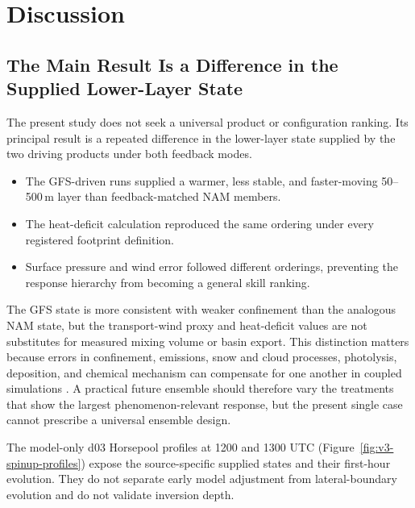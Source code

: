 \documentclass[air,article,submit,moreauthors]{Definitions/mdpi}
\begin{document}
\section{Discussion}
\label{sec:v3-discussion}

\subsection{The Main Result Is a Difference in the Supplied Lower-Layer State}
\label{sec:v3-disc-supplied-state}

The present study does not seek a universal product or configuration ranking.
Its principal result is a repeated difference in the lower-layer state supplied by the two driving products under both feedback modes.

\begin{itemize}
  \item The GFS-driven runs supplied a warmer, less stable, and faster-moving 50--500\,m layer than feedback-matched NAM members.
  \item The heat-deficit calculation reproduced the same ordering under every registered footprint definition.
  \item Surface pressure and wind error followed different orderings, preventing the response hierarchy from becoming a general skill ranking.
\end{itemize}

The GFS state is more consistent with weaker confinement than the analogous NAM state, but the transport-wind proxy and heat-deficit values are not substitutes for measured mixing volume or basin export.
This distinction matters because errors in confinement, emissions, snow and cloud processes, photolysis, deposition, and chemical mechanism can compensate for one another in coupled simulations \citep{Ahmadov2015-zm,Neemann2015-ws,Matichuk2017-bq}.
A practical future ensemble should therefore vary the treatments that show the largest phenomenon-relevant response, but the present single case cannot prescribe a universal ensemble design.

The model-only d03 Horsepool profiles at 1200 and 1300 UTC (Figure~\ref{fig:v3-spinup-profiles}) expose the source-specific supplied states and their first-hour evolution.
They do not separate early model adjustment from lateral-boundary evolution and do not validate inversion depth.
\end{document}
